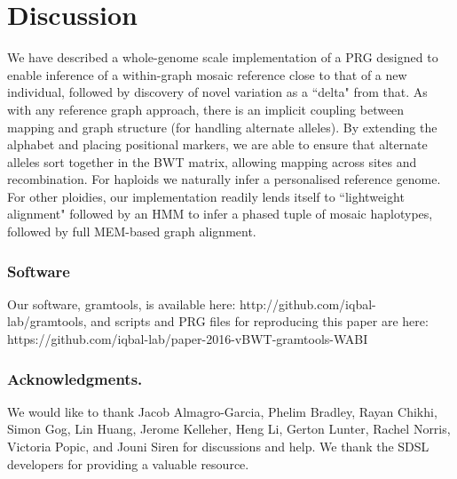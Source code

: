 \documentclass[runningheads,a4paper]{llncs}
\begin{document}
\section{Discussion}
We have described a whole-genome scale implementation of a PRG designed to enable inference of a within-graph mosaic reference close to that of a new individual, followed by discovery of novel variation as a ``delta" from that. As with any reference graph approach, there is an implicit coupling between mapping and graph structure (for handling alternate alleles). By extending the alphabet and placing positional markers, we are able to ensure that alternate alleles sort together in the BWT matrix, allowing mapping across sites and recombination. For haploids we naturally infer a personalised reference genome. For other ploidies, our implementation readily lends itself to ``lightweight alignment" followed by an HMM to infer a phased tuple of mosaic haplotypes, followed by full MEM-based graph alignment.  


\subsubsection{Software}
Our software, gramtools, is available here: http://github.com/iqbal-lab/gramtools, and scripts and PRG files for reproducing this paper are here: https://github.com/iqbal-lab/paper-2016-vBWT-gramtools-WABI

\subsubsection*{Acknowledgments.} We would like to thank Jacob Almagro-Garcia, Phelim Bradley, Rayan Chikhi, Simon Gog, Lin Huang, Jerome Kelleher, Heng Li,  Gerton Lunter, Rachel Norris, Victoria Popic, and Jouni Siren   for discussions and help. We thank the SDSL developers for providing a valuable  resource.
\end{document}
